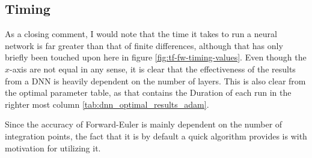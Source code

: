 \subsection{Timing}
As a closing comment, I would note that the time it takes to run a neural network is far greater than that of finite differences, although that has only briefly been touched upon here in figure \ref{fig:tf-fw-timing-values}. Even though the $x$-axis are not equal in any sense, it is clear that the effectiveness of the results from a DNN is heavily dependent on the number of layers. This is also clear from the optimal parameter table, as that contains the Duration of each run in the righter most column \ref{tab:dnn_optimal_results_adam}. 

Since the accuracy of Forward-Euler is mainly dependent on the number of integration points, the fact that it is by default a quick algorithm provides is with motivation for utilizing it.